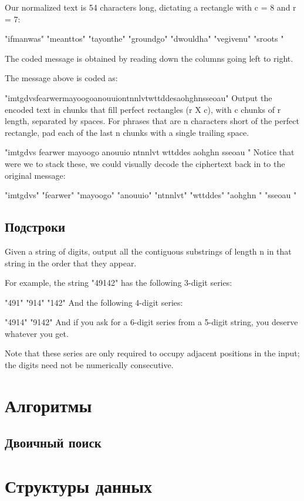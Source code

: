\documentclass[10pt,twoside,openany]{book}
\begin{document}
Our normalized text is 54 characters long, dictating a rectangle with c = 8 and r = 7:

"ifmanwas"
"meanttos"
"tayonthe"
"groundgo"
"dwouldha"
"vegivenu"
"sroots  "

The coded message is obtained by reading down the columns going left to right.

The message above is coded as:

"imtgdvsfearwermayoogoanouuiontnnlvtwttddesaohghnsseoau"
Output the encoded text in chunks that fill perfect rectangles (r X c), with c chunks of r length, separated by spaces. For phrases that are n characters short of the perfect rectangle, pad each of the last n chunks with a single trailing space.

"imtgdvs fearwer mayoogo anouuio ntnnlvt wttddes aohghn  sseoau "
Notice that were we to stack these, we could visually decode the ciphertext back in to the original message:

"imtgdvs"
"fearwer"
"mayoogo"
"anouuio"
"ntnnlvt"
"wttddes"
"aohghn "
"sseoau "

\section{Подстроки}

Given a string of digits, output all the contiguous substrings of length n in that string in the order that they appear.

For example, the string "49142" has the following 3-digit series:

"491"
"914"
"142"
And the following 4-digit series:

"4914"
"9142"
And if you ask for a 6-digit series from a 5-digit string, you deserve whatever you get.

Note that these series are only required to occupy adjacent positions in the input; the digits need not be numerically consecutive.



\chapter{Алгоритмы}

\section{Двоичный поиск}

\chapter{Структуры данных}
\end{document}
